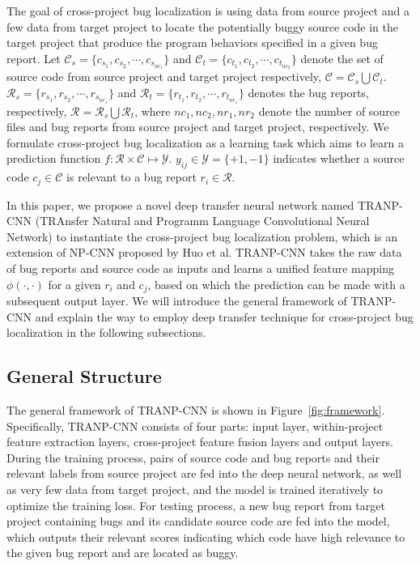 The goal of cross-project bug localization is using data from source project and a few data from target project to locate the potentially buggy source code in the target project that produce the program behaviors specified in a
given bug report. Let $\mathcal{C}_s =\{ c_{s_1}, c_{s_2}, \cdots, c_{s_{nc_1}}\}$ and $\mathcal{C}_t =\{ c_{t_1}, c_{t_2}, \cdots, c_{t_{nc_2}}\}$ denote the set of source code from source project and target project respectively, $\mathcal{C}=\mathcal{C}_s \bigcup \mathcal{C}_t $. $\mathcal{R}_s =\{ r_{s_1}, r_{s_2}, \cdots, r_{s_{nr_1}}\}$ and $\mathcal{R}_t =\{ r_{t_1}, r_{t_2}, \cdots, r_{t_{nr_1}}\}$ denotes the bug reports, respectively, $\mathcal{R}=\mathcal{R}_s \bigcup \mathcal{R}_t $, where $nc_1, nc_2, nr_1, nr_2$ denote the number of source files and bug reports from source project and target project, respectively. We formulate cross-project bug localization as a learning task which aims to learn a prediction function $f: \mathcal{R} \times \mathcal{C} \mapsto \mathcal{Y}$. $y_{ij} \in \mathcal{Y} = \{+1, -1 \}$ indicates whether a source code $c_j \in \mathcal{C} $ is relevant to a bug report $r_i \in \mathcal{R}$.

In this paper, we propose a novel deep transfer neural network named TRANP-CNN (TRAnsfer Natural and Programm Language Convolutional Neural Network) to instantiate the cross-project bug localization problem, which is an extension of NP-CNN proposed by Huo et al. TRANP-CNN takes the raw data of bug reports and source code as inputs and learns a unified feature mapping $\phi(\cdot, \cdot)$ for a given $r_i$ and $c_j$, based on which the prediction can be made with a subsequent output layer. We will introduce the general framework of TRANP-CNN and explain the way to employ deep transfer technique for cross-project bug localization in the following subsections.

\subsection{General Structure}
The general framework of TRANP-CNN is shown in Figure~\ref{fig:framework}. Specifically, TRANP-CNN consists of four parts: input layer, within-project feature extraction layers, cross-project feature fusion layers and output layers. During the training process, pairs of source code and bug reports and their relevant labels from source project are fed into the deep neural network, as well as very few data from target project, and the model is trained iteratively to optimize the training loss. For testing process, a new bug report from target project containing bugs and its candidate source code are fed into the model, which outputs their relevant scores indicating which code have high relevance to the given bug report and are located as buggy.

